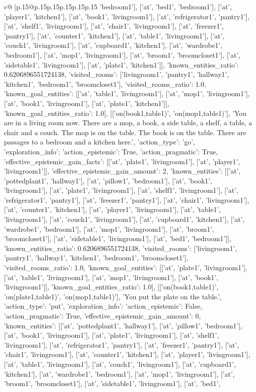\documentclass{article}
\begin{document}
{\begin{supertabular}{c@{$\;$}|p{.15\linewidth}@{}p{.15\linewidth}p{.15\linewidth}p{.15\linewidth}p{.15\linewidth}p{.15\linewidth}}
{{{'bedroom1'], ['at', 'bed1', 'bedroom1'], ['at', 'player1', 'kitchen1'], ['at', 'book1', 'livingroom1'], ['at', 'refrigerator1', 'pantry1'], ['at', 'shelf1', 'livingroom1'], ['at', 'chair1', 'livingroom1'], ['at', 'freezer1', 'pantry1'], ['at', 'counter1', 'kitchen1'], ['at', 'table1', 'livingroom1'], ['at', 'couch1', 'livingroom1'], ['at', 'cupboard1', 'kitchen1'], ['at', 'wardrobe1', 'bedroom1'], ['at', 'mop1', 'livingroom1'], ['at', 'broom1', 'broomcloset1'], ['at', 'sidetable1', 'livingroom1'], ['at', 'plate1', 'kitchen1']], 'known_entities_ratio': 0.6206896551724138, 'visited_rooms': ['livingroom1', 'pantry1', 'hallway1', 'kitchen1', 'bedroom1', 'broomcloset1'], 'visited_rooms_ratio': 1.0, 'known_goal_entities': [['at', 'table1', 'livingroom1'], ['at', 'mop1', 'livingroom1'], ['at', 'book1', 'livingroom1'], ['at', 'plate1', 'kitchen1']], 'known_goal_entities_ratio': 1.0}}], [['on(book1,table1)', 'on(mop1,table1)'], 'You are in a living room now. There are a mop, a book, a side table, a shelf, a table, a chair and a couch. The mop is on the table. The book is on the table. There are passages to a bedroom and a kitchen here.', {'action_type': 'go', 'exploration_info': {'action_epistemic': True, 'action_pragmatic': True, 'effective_epistemic_gain_facts': [['at', 'plate1', 'livingroom1'], ['at', 'player1', 'livingroom1']], 'effective_epistemic_gain_amount': 2, 'known_entities': [['at', 'pottedplant1', 'hallway1'], ['at', 'pillow1', 'bedroom1'], ['at', 'book1', 'livingroom1'], ['at', 'plate1', 'livingroom1'], ['at', 'shelf1', 'livingroom1'], ['at', 'refrigerator1', 'pantry1'], ['at', 'freezer1', 'pantry1'], ['at', 'chair1', 'livingroom1'], ['at', 'counter1', 'kitchen1'], ['at', 'player1', 'livingroom1'], ['at', 'table1', 'livingroom1'], ['at', 'couch1', 'livingroom1'], ['at', 'cupboard1', 'kitchen1'], ['at', 'wardrobe1', 'bedroom1'], ['at', 'mop1', 'livingroom1'], ['at', 'broom1', 'broomcloset1'], ['at', 'sidetable1', 'livingroom1'], ['at', 'bed1', 'bedroom1']], 'known_entities_ratio': 0.6206896551724138, 'visited_rooms': ['livingroom1', 'pantry1', 'hallway1', 'kitchen1', 'bedroom1', 'broomcloset1'], 'visited_rooms_ratio': 1.0, 'known_goal_entities': [['at', 'plate1', 'livingroom1'], ['at', 'table1', 'livingroom1'], ['at', 'mop1', 'livingroom1'], ['at', 'book1', 'livingroom1']], 'known_goal_entities_ratio': 1.0}}], [['on(book1,table1)', 'on(plate1,table1)', 'on(mop1,table1)'], 'You put the plate on the table.', {'action_type': 'put', 'exploration_info': {'action_epistemic': False, 'action_pragmatic': True, 'effective_epistemic_gain_amount': 0, 'known_entities': [['at', 'pottedplant1', 'hallway1'], ['at', 'pillow1', 'bedroom1'], ['at', 'book1', 'livingroom1'], ['at', 'plate1', 'livingroom1'], ['at', 'shelf1', 'livingroom1'], ['at', 'refrigerator1', 'pantry1'], ['at', 'freezer1', 'pantry1'], ['at', 'chair1', 'livingroom1'], ['at', 'counter1', 'kitchen1'], ['at', 'player1', 'livingroom1'], ['at', 'table1', 'livingroom1'], ['at', 'couch1', 'livingroom1'], ['at', 'cupboard1', 'kitchen1'], ['at', 'wardrobe1', 'bedroom1'], ['at', 'mop1', 'livingroom1'], ['at', 'broom1', 'broomcloset1'], ['at', 'sidetable1', 'livingroom1'], ['at', 'bed1', }}}
\end{supertabular}}
\end{document}

